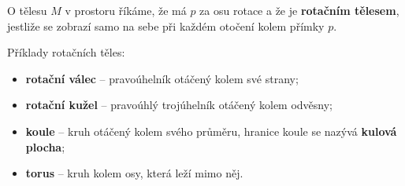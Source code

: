 \begin{definition}
    O tělesu $M$ v prostoru říkáme, že má $p$ za osu rotace a že je \textbf{rotačním
    tělesem}, jestliže se zobrazí samo na sebe při každém otočení kolem přímky $p.$
\end{definition}

\begin{pozn}
Příklady rotačních těles:
\begin{itemize}
\item \textbf{rotační válec} -- pravoúhelník otáčený kolem své strany;
\item \textbf{rotační kužel} -- pravoúhlý trojúhelník otáčený kolem odvěsny;
\item \textbf{koule} -- kruh otáčený kolem svého průměru, hranice koule se nazývá \textbf{kulová plocha};
\item \textbf{torus} -- kruh kolem osy, která leží mimo něj.
\end{itemize}
\end{pozn}
